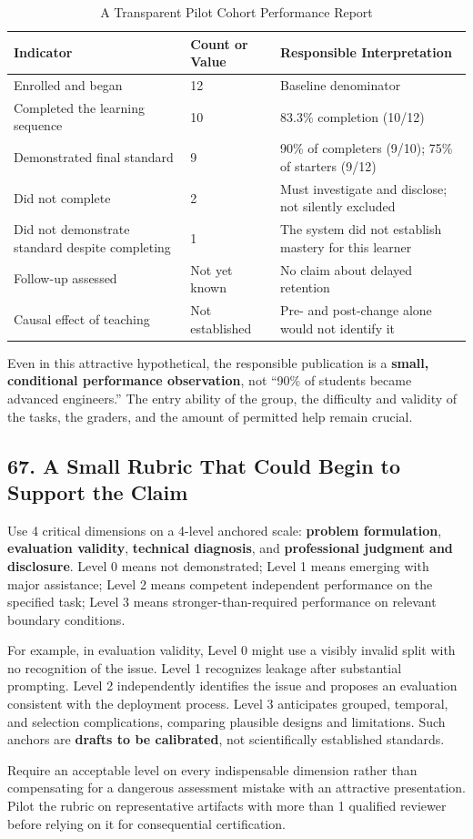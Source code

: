 \begin{table}[t]
\centering
\small
\caption{A Transparent Pilot Cohort Performance Report}
\begin{tabularx}{\textwidth}{p{}p{}X}
\toprule
\textbf{Indicator} & \textbf{Count or Value} & \textbf{Responsible Interpretation} \\
\midrule
Enrolled and began & 12 & Baseline denominator \\
Completed the learning sequence & 10 & 83.3\% completion (10/12) \\
Demonstrated final standard & 9 & 90\% of completers (9/10); 75\% of starters (9/12) \\
Did not complete & 2 & Must investigate and disclose; not silently excluded \\
Did not demonstrate standard despite completing & 1 & The system did not establish mastery for this learner \\
Follow-up assessed & Not yet known & No claim about delayed retention \\
Causal effect of teaching & Not established & Pre- and post-change alone would not identify it \\
\bottomrule
\end{tabularx}
\end{table}

Even in this attractive hypothetical, the responsible publication is a \textbf{small, conditional performance observation}, not ``90\% of students became advanced engineers.'' The entry ability of the group, the difficulty and validity of the tasks, the graders, and the amount of permitted help remain crucial.

\subsection*{67. A Small Rubric That Could Begin to Support the Claim}

Use 4 critical dimensions on a 4-level anchored scale: \textbf{problem formulation}, \textbf{evaluation validity}, \textbf{technical diagnosis}, and \textbf{professional judgment and disclosure}. Level 0 means not demonstrated; Level 1 means emerging with major assistance; Level 2 means competent independent performance on the specified task; Level 3 means stronger-than-required performance on relevant boundary conditions.

For example, in evaluation validity, Level 0 might use a visibly invalid split with no recognition of the issue. Level 1 recognizes leakage after substantial prompting. Level 2 independently identifies the issue and proposes an evaluation consistent with the deployment process. Level 3 anticipates grouped, temporal, and selection complications, comparing plausible designs and limitations. Such anchors are \textbf{drafts to be calibrated}, not scientifically established standards.

Require an acceptable level on every indispensable dimension rather than compensating for a dangerous assessment mistake with an attractive presentation. Pilot the rubric on representative artifacts with more than 1 qualified reviewer before relying on it for consequential certification.
